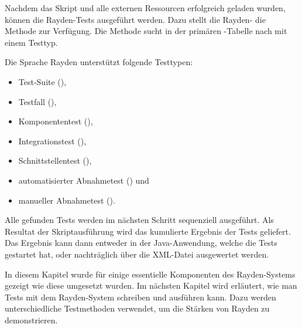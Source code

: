 \SuperPar
Nachdem das Skript und alle externen Ressourcen erfolgreich geladen wurden, können die Rayden-Tests ausgeführt werden. Dazu stellt die Rayden- die Methode  zur Verfügung. Die Methode sucht in der primären -Tabelle nach  mit einem Testtyp. 

\SuperPar
Die Sprache Rayden unterstützt folgende Testtypen:

\begin{itemize}
\item Test-Suite (),
\item Testfall (),
\item Komponententest (),
\item Integrationstest (),
\item Schnittstellentest (),
\item automatisierter Abnahmetest () und
\item manueller Abnahmetest ().
\end{itemize}

\SuperPar
Alle gefunden Tests werden im nächsten Schritt sequenziell ausgeführt. Als Resultat der Skriptausführung wird das kumulierte Ergebnis der Tests geliefert. Das Ergebnis kann dann entweder in der Java-Anwendung, welche die Tests gestartet hat, oder nachträglich über die XML-Datei ausgewertet werden.

\SuperPar
In diesem Kapitel wurde für einige essentielle Komponenten des Rayden-Systems gezeigt wie diese umgesetzt wurden. Im nächsten Kapitel wird erläutert, wie man Tests mit dem Rayden-System schreiben und ausführen kann. Dazu werden unterschiedliche Testmethoden verwendet, um die Stärken von Rayden zu demonstrieren.
